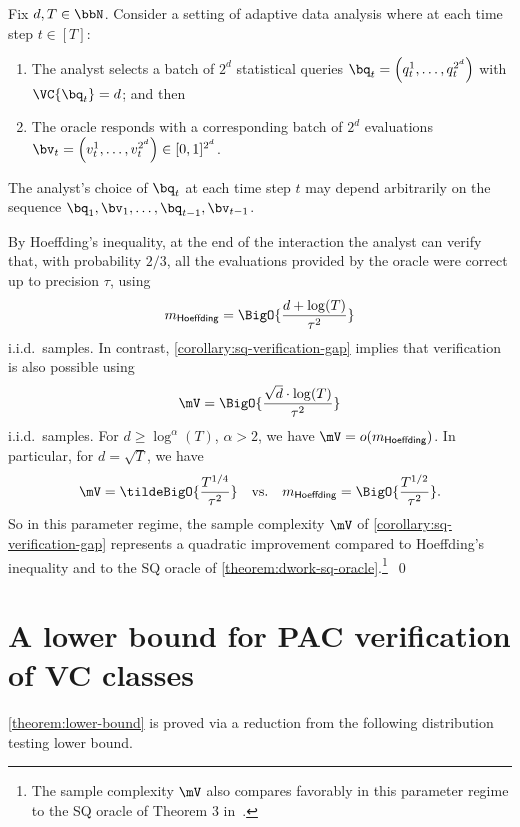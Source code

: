\documentclass{toc}
\begin{document}
\begin{example}
	Fix $d,T \in \bbN$. Consider a setting of adaptive data analysis where at each time step $t \in [T]$:
	\begin{enumerate}
		\item{
			The analyst selects a batch of $2^d$ statistical queries $\bq_t = \left(q_t^1,\dots,q_t^{2^d}\right)$ with $\VC{\bq_t} = d$; and then
		}
		\item{
			The oracle responds with a corresponding batch of $2^d$ evaluations $\bv_t = \left(v_t^1,\dots,v_t^{2^d}\right) \in [0,1]^{2^d}$.
		}
	\end{enumerate}
	The analyst's choice of $\bq_t$ at each time step $t$ may depend arbitrarily on the sequence $\bq_1,\bv_1,\dots,\allowbreak\bq_{t-1},\allowbreak\bv_{t-1}$.

	By Hoeffding's inequality, at the end of the interaction the analyst can verify that, with probability $2/3$, all the evaluations provided by the oracle were correct up to precision $\tau$, using 
	\[
		m_{\mathsf{Hoeffding}} = \BigO{\frac{d + \log(T)}{\tau^2}}
	\]
	i.i.d.\ samples. In contrast, \cref{corollary:sq-verification-gap} implies that verification is also possible using
	\[
		\mV = \BigO{
			\frac{
				\sqrt{d}\cdot \log(T)
			}{
				\tau^2
			}
		}
	\]
	i.i.d.\ samples. For $d \geq \log^\alpha(T)$, $\alpha > 2$, we have $\mV = o(m_{\mathsf{Hoeffding}})$. In particular, for $d = \sqrt{T}$, we have 
	\[
		\mV = \tildeBigO{\frac{T^{1/4}}{\tau^2}}
		 \quad \text{vs.} \quad
		m_{\mathsf{Hoeffding}} = \BigO{\frac{T^{1/2}}{\tau^2}}.
	\]
	So in this parameter regime, the sample complexity $\mV$ of \cref{corollary:sq-verification-gap} represents a quadratic improvement compared to Hoeffding's inequality and to the SQ oracle of \cref{theorem:dwork-sq-oracle}.\footnote{
		The sample complexity $\mV$ also compares favorably in this parameter regime to the SQ oracle of Theorem 3 in~\cite{DBLP:conf/stoc/DworkFHPRR15}. 
	}~\qed
\end{example}



\section{A lower bound for PAC verification of VC classes}
\label{section:lower-bound}

\cref{theorem:lower-bound} is proved via a reduction from the following distribution testing lower bound.
\end{document}
